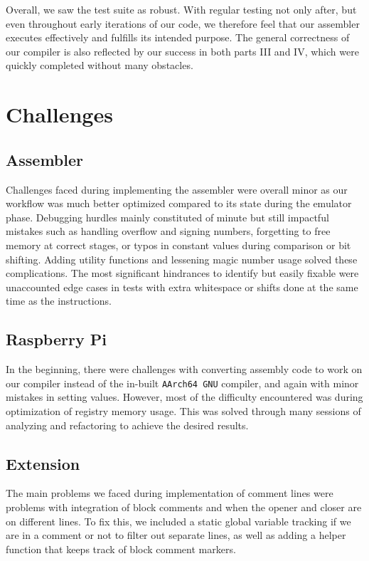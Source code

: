 \documentclass[11pt]{article}
\begin{document}
Overall, we saw the test suite as robust. With regular testing not only after, but even 
throughout early iterations of our code, we therefore feel that our assembler executes 
effectively and fulfills its intended purpose. The general correctness of our compiler is also 
reflected by our success in both parts III and IV, which were quickly completed without many 
obstacles.

\section{Challenges}

\subsection{Assembler}

Challenges faced during implementing the assembler were overall minor as our workflow was much 
better optimized compared to its state during the emulator phase. Debugging hurdles mainly 
constituted of minute but still impactful mistakes such as handling overflow and signing numbers, 
forgetting to free memory at correct stages, or typos in constant values during comparison 
or bit shifting. Adding utility functions and lessening magic number usage solved these complications. 
The most significant hindrances to identify but easily fixable were unaccounted edge cases in tests 
with extra whitespace or shifts done at the same time as the instructions.

\subsection{Raspberry Pi}

In the beginning, there were challenges with converting assembly code to work on our compiler 
instead of the in-built \verb|AArch64 GNU| compiler, and again with minor mistakes in setting 
values. However, most of the difficulty encountered was during optimization of registry memory 
usage. This was solved through many sessions of analyzing and refactoring to achieve the 
desired results.

\subsection{Extension}

The main problems we faced during implementation of comment lines were problems with 
integration of block comments and when the opener and closer are on different lines. To fix 
this, we included a static global variable tracking if we are in a comment or not to filter out 
separate lines, as well as adding a helper function that keeps track of block comment markers.
\end{document}
